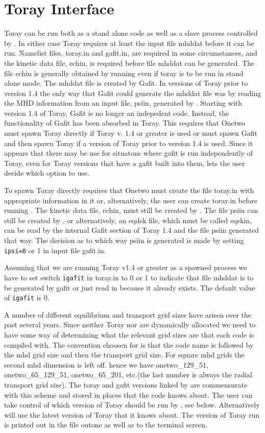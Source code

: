 \section{Toray Interface} 

Toray can be run both as a stand alone code as well as a  slave process
controlled by \ot. In either case Toray requires at least the input file mhddat
before it can be run. Namelist files, toray.in and gafit.in,  are  required in
some circumstances,  and the kinetic data file, echin, is required before file
mhddat can be generated. The file echin is generally obtained by running \ot
even if toray is to be run in stand alone mode. The mhddat file is created by
Gafit. In versions of Toray  prior to version 1.4 the only way that Gafit could
generate the mhddat file was by reading the MHD information from an input file,
psiin, generated by \ot. Starting with version 1.4 of Toray, Gafit is no longer
an indepedent code. Instead, the functionality of Gafit has been absorbed in
Toray. This requires that Onetwo must spawn Toray directly if Toray v. 1.4 or
greater is used or \ot must spawn Gafit and then spawn Toray if a version of
Toray prior to version 1.4 is used. Since it appears that there may be use for
situatons where gafit is run independently of Toray, even for Toray versions
that have a gafit built into them, \ot lets the user decide which option to use.

To spawn Toray directly requires that Onetwo must create the file toray.in with
appropriate information in it or, alternatively, the user can create toray.in
before running \ot. The kinetic data file, echin, must still be created by \ot.
The file psiin can still be created by \ot, or alternatively, an eqdsk file,
which must be  called eqskin, can be read by the internal Gafit section of Toray
1.4 and the file psiin generated that way. The decision as to which way psiin is
generated  is made by setting \texttt{ipsi=0} or 1 in input file gafit.in. 

Assuming that we are running Toray v1.4 or greater as a \ot spawned process we
have to set switch \texttt{igafit} in toray.in to 0 or 1 to indicate that file
mhddat is to be generated by gafit or just read in because  it already exists.
The default value of \texttt{igafit} is 0.

A number of different equilibrium and transport grid sizes  have arisen over the
past several years. Since neither Toray nor \ot are dynamically allocated we
need to have some way of determining what the relevant grid sizes are that each
code is compiled with. The convention choosen for \ot is that the code name is
followed by the mhd grid size and then the transport grid size. For square mhd
grids the second mhd dimension is left off. hence we have onetwo\_129\_51,
onetwo\_65\_129\_51, onetwo\_65\_201, etc.(the last number is always the radial
transport grid size). The toray and gafit versions linked by \ot are 
commensurate with this scheme and  stored in places that the \ot code knows
about. The user can take control of which version of Toray should be run by \ot,
see below. Alternatively \ot will use the latest version of Toray that it knows
about. The version of Toray run is  printed out  in the file outone as well as
to  the terminal screen.

